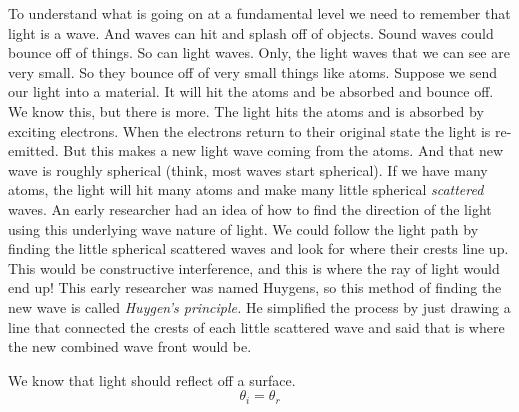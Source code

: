 \documentclass{article}
\begin{document}
To understand what is going on at a fundamental level we need to remember
that light is a wave. And waves can hit and splash off of objects. Sound
waves could bounce off of things. So can light waves. Only, the light waves
that we can see are very small. So they bounce off of very small things like
atoms. Suppose we send our light into a material. It will hit the atoms and
be absorbed and bounce off. We know this, but there is more. The light hits
the atoms and is absorbed by exciting electrons. When the electrons return
to their original state the light is re-emitted. But this makes a new light
wave coming from the atoms. And that new wave is roughly spherical (think,
most waves start spherical). If we have many atoms, the light will hit many
atoms and make many little spherical \emph{scattered} waves. An early
researcher had an idea of how to find the direction of the light using this
underlying wave nature of light. We could follow the light path by finding
the little spherical scattered waves and look for where their crests line
up. This would be constructive interference, and this is where the ray of
light would end up! This early researcher was named
Huygens, so this method of finding the new wave is called \emph{Huygen's
principle.} He simplified the process by just drawing a line that connected
the crests of each little scattered wave and said that is where the new
combined wave front would be.

We know that light should reflect off a surface. 
\[
\theta _{i}=\theta _{r}
\]
\end{document}

